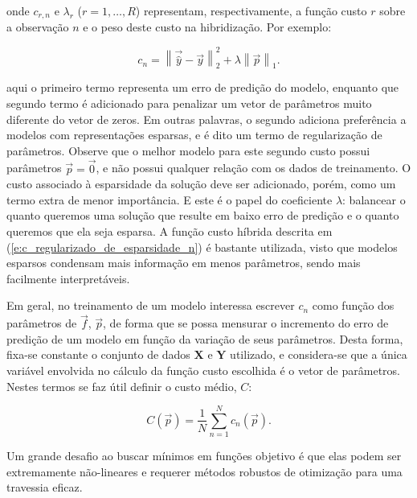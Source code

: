     \noindent onde $c_{r,n}$ e $\lambda_r$ ($r=1,\ldots,R$) representam, respectivamente, a função custo $r$ sobre a observação $n$ e o peso deste custo na hibridização. Por exemplo\DIFdelbegin {}\DIFdelend \DIFaddbegin {}\DIFaddend :

    \begin{equation} \label{e:c_regularizado_de_esparsidade_n}
      c_n = \left\| \vec{\hat{y}} - \vec{y} \right\|_2^2 + \lambda \left\| \vec{p} \right\|_1
      .
    \end{equation}

    \noindent aqui o primeiro termo representa um erro de predição do modelo, enquanto que segundo termo é adicionado para penalizar um vetor de parâmetros muito diferente do vetor de zeros. Em outras palavras, o segundo adiciona preferência a modelos com representações esparsas, e é dito um termo de regularização de parâmetros. Observe que o melhor modelo para este segundo custo possui parâmetros $\vec{p} = \vec{0}$, e não possui qualquer relação com os dados de treinamento. O custo associado à esparsidade da solução deve ser adicionado, porém, como um termo extra de menor importância. E este é o papel do coeficiente $\lambda$: balancear o quanto queremos uma solução que resulte em baixo erro de predição e o quanto queremos que ela seja esparsa. A função custo híbrida descrita em (\ref{e:c_regularizado_de_esparsidade_n}) é bastante utilizada, visto que modelos esparsos condensam mais informação em menos parâmetros, sendo mais facilmente interpretáveis.

    Em geral, no treinamento de um modelo interessa escrever $c_n$ como função dos parâmetros de $\vec{f}$, $\vec{p}$, de forma que se possa mensurar o incremento do erro de predição de um modelo em função da variação de seus parâmetros. Desta forma, fixa-se constante o conjunto de dados $\boldsymbol{X}$ e $\boldsymbol{Y}$ utilizado, e considera-se que a única variável envolvida no cálculo da função custo escolhida é o vetor de parâmetros. Nestes termos se faz útil definir o custo médio, $C$:

    \begin{equation} \label{e:C}
      C(\vec{p}) = \frac{1}{N} \sum \limits_{n=1}^N c_n(\vec{p})
      .
    \end{equation}

    Um grande desafio ao buscar mínimos em funções objetivo é que elas podem ser extremamente não-lineares e requerer métodos robustos de otimização para uma travessia eficaz.

